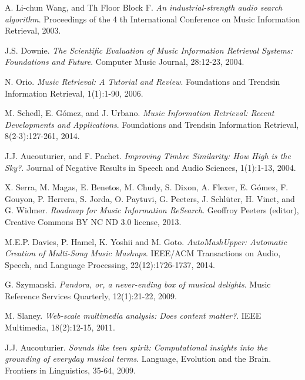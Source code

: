 \documentclass[11pt, oneside]{Thesis} %
\begin{document}
\label{Bibliography}


\begin{thebibliography}{99}
A. Li-chun Wang, and Th Floor Block F. 
\textit{An industrial-strength audio search algorithm}. 
Proceedings of the 4 th International Conference on Music Information Retrieval, 2003.
 
J.S. Downie.
\textit{The Scientific Evaluation of Music Information Retrieval Systems: Foundations and Future}. 
Computer Music Journal, 28:12-23, 2004.
 
N. Orio.
\textit{Music Retrieval: A Tutorial and Review}. 
Foundations and Trends\textregistered in Information Retrieval, 1(1):1-90, 2006.

M. Schedl, E. Gómez, and J. Urbano.
\textit{Music Information Retrieval: Recent Developments and Applications}. 
Foundations and Trends\textregistered in Information Retrieval, 8(2-3):127-261, 2014.

J.J. Aucouturier, and F. Pachet.
\textit{Improving Timbre Similarity: How High is the Sky?}. 
Journal of Negative Results in Speech and Audio Sciences, 1(1):1-13, 2004.

X. Serra, M. Magas, E. Benetos, M. Chudy, S. Dixon, A. Flexer, E. Gómez, F. Gouyon, P. Herrera, S. Jorda, O. Paytuvi, G. Peeters, J. Schlüter, H. Vinet, and G. Widmer.
\textit{Roadmap for Music Information ReSearch}. 
Geoffroy Peeters (editor), Creative Commons BY NC ND 3.0 license, 2013.

M.E.P. Davies, P. Hamel, K. Yoshii and M. Goto.
\textit{AutoMashUpper: Automatic Creation of Multi-Song Music Mashups}. 
IEEE/ACM Transactions on Audio, Speech, and Language Processing, 22(12):1726-1737, 2014.

G. Szymanski.
\textit{Pandora, or, a never-ending box of musical delights}. 
Music Reference Services Quarterly, 12(1):21-22, 2009.

M. Slaney.
\textit{Web-scale multimedia analysis: Does content matter?}. 
IEEE Multimedia, 18(2):12-15, 2011.

J.J. Aucouturier.
\textit{Sounds like teen spirit: Computational insights into the grounding of everyday musical terms}. 
Language, Evolution and the Brain. Frontiers in Linguistics, 35-64, 2009.


\end{thebibliography}
\end{document}
